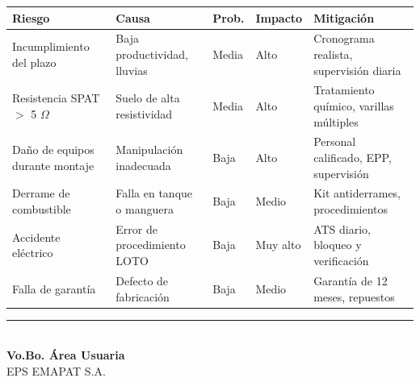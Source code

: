 \documentclass[12pt,a4paper]{article}
\begin{document}
\begin{center}
\begin{tabular}{L{3cm}L{3.5cm}L{2cm}L{2.5cm}L{3cm}}
\toprule
\textbf{Riesgo} & \textbf{Causa} & \textbf{Prob.} & \textbf{Impacto} & \textbf{Mitigación} \\
\midrule
Incumplimiento del plazo & Baja productividad, lluvias & Media & Alto & Cronograma realista, supervisión diaria \\
Resistencia SPAT $>$ 5 $\Omega$ & Suelo de alta resistividad & Media & Alto & Tratamiento químico, varillas múltiples \\
Daño de equipos durante montaje & Manipulación inadecuada & Baja & Alto & Personal calificado, EPP, supervisión \\
Derrame de combustible & Falla en tanque o manguera & Baja & Medio & Kit antiderrames, procedimientos \\
Accidente eléctrico & Error de procedimiento LOTO & Baja & Muy alto & ATS diario, bloqueo y verificación \\
Falla de garantía & Defecto de fabricación & Baja & Medio & Garantía de 12 meses, repuestos \\
\bottomrule
\end{tabular}
\end{center}

\vspace{1.5cm}

\begin{center}
\rule{10cm}{0.4pt} \\
\textbf{Vo.Bo. Área Usuaria} \\
EPS EMAPAT S.A.
\end{center}
\end{document}
